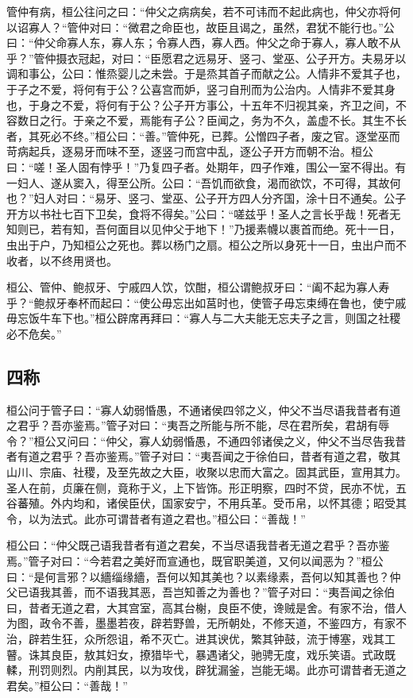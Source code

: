 \documentclass[]{article}
\begin{document}
管仲有病，桓公往问之曰：``仲父之病病矣，若不可讳而不起此病也，仲父亦将何以诏寡人？``管仲对曰：``微君之命臣也，故臣且谒之，虽然，君犹不能行也。''公曰：``仲父命寡人东，寡人东；令寡人西，寡人西。仲父之命于寡人，寡人敢不从乎？''管仲摄衣冠起，对曰：``臣愿君之远易牙、竖刁、堂巫、公子开方。夫易牙以调和事公，公曰：惟烝婴儿之未尝。于是烝其首子而献之公。人情非不爱其子也，于子之不爱，将何有于公？公喜宫而妒，竖刁自刑而为公治内。人情非不爱其身也，于身之不爱，将何有于公？公子开方事公，十五年不归视其亲，齐卫之间，不容数日之行。于亲之不爱，焉能有子公？臣闻之，务为不久，盖虚不长。其生不长者，其死必不终。''桓公曰：``善。''管仲死，已葬。公憎四子者，废之官。逐堂巫而苛病起兵，逐易牙而味不至，逐竖刁而宫中乱，逐公子开方而朝不治。桓公曰：``嗟！圣人固有悖乎！''乃复四子者。处期年，四子作难，围公一室不得出。有一妇人、遂从窦入，得至公所。公曰：``吾饥而欲食，渴而欲饮，不可得，其故何也？''妇人对曰：``易牙、竖刁、堂巫、公子开方四人分齐国，涂十日不通矣。公子开方以书社七百下卫矣，食将不得矣。''公曰：``嗟兹乎！圣人之言长乎哉！死者无知则已，若有知，吾何面目以见仲父于地下！''乃援素幭以裹首而绝。死十一日，虫出于户，乃知桓公之死也。葬以杨门之扇。桓公之所以身死十一日，虫出户而不收者，以不终用贤也。

桓公、管仲、鲍叔牙、宁戚四人饮，饮酣，桓公谓鲍叔牙曰：``阖不起为寡人寿乎？``鲍叔牙奉杯而起曰：``使公毋忘出如莒时也，使管子毋忘束缚在鲁也，使宁戚毋忘饭牛车下也。''桓公辟席再拜曰：``寡人与二大夫能无忘夫子之言，则国之社稷必不危矣。''

\hypertarget{header-n451}{%
\subsection{四称}\label{header-n451}}

桓公问于管子曰：``寡人幼弱惛愚，不通诸侯四邻之义，仲父不当尽语我昔者有道之君乎？吾亦鉴焉。''管子对曰：``夷吾之所能与所不能，尽在君所矣，君胡有辱令？''桓公又问曰：``仲父，寡人幼弱惛愚，不通四邻诸侯之义，仲父不当尽告我昔者有道之君乎？吾亦鉴焉。''管子对曰：``夷吾闻之于徐伯曰，昔者有道之君，敬其山川、宗庙、社稷，及至先故之大臣，收聚以忠而大富之。固其武臣，宣用其力。圣人在前，贞廉在侧，竟称于义，上下皆饰。形正明察，四时不贷，民亦不忧，五谷蕃殖。外内均和，诸侯臣伏，国家安宁，不用兵革。受币帛，以怀其德；昭受其令，以为法式。此亦可谓昔者有道之君也。''桓公曰：``善哉！''

桓公曰：``仲父既己语我昔者有道之君矣，不当尽语我昔者无道之君乎？吾亦鉴焉。''管子对曰：``今若君之美好而宣通也，既官职美道，又何以闻恶为？''桓公曰：``是何言邪？以繬缁缘繬，吾何以知其美也？以素缘素，吾何以知其善也？仲父已语我其善，而不语我其恶，吾岂知善之为善也？''管子对曰：``夷吾闻之徐伯曰，昔者无道之君，大其宫室，高其台榭，良臣不使，谗贼是舍。有家不治，借人为图，政令不善，墨墨若夜，辟若野兽，无所朝处，不修天道，不鉴四方，有家不治，辟若生狂，众所怨诅，希不灭亡。进其谀优，繁其钟鼓，流于博塞，戏其工瞽。诛其良臣，敖其妇女，撩猎毕弋，暴遇诸父，驰骋无度，戏乐笑语。式政既輮，刑罚则烈。内削其民，以为攻伐，辟犹漏釜，岂能无竭。此亦可谓昔者无道之君矣。''桓公曰：``善哉！''
\end{document}
